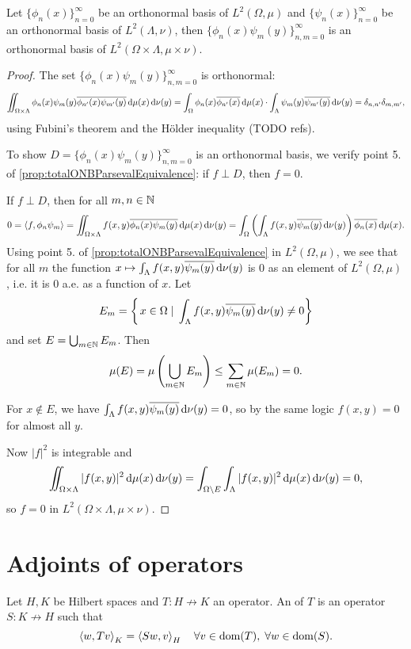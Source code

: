 \begin{lemma}
Let $\{\phi_n(x)\}^\infty_{n=0}$ be an orthonormal basis of $L^2(\Omega, \mu)$ and $\{\psi_n(x)\}^\infty_{n=0}$ be an orthonormal basis of $L^2(\Lambda, \nu)$, then $\{\phi_n(x)\psi_m(y)\}^\infty_{n,m=0}$ is an orthonormal basis of $L^2(\Omega\times\Lambda, \mu\times\nu)$.
\end{lemma}
\begin{proof}
The set $\{\phi_n(x)\psi_m(y)\}^\infty_{n,m=0}$ is orthonormal:
\[ \iint_{\Omega\times\Lambda} \phi_n(x)\psi_m(y)\overline{\phi_{n'}(x)\psi_{m'}(y)}\operatorname{d \!}{\mu(x)}\operatorname{d \!}{\nu(y)} = \int_\Omega\phi_n(x)\overline{\phi_{n'}(x)}\operatorname{d \!}{\mu(x)} \cdot \int_\Lambda\psi_m(y)\overline{\psi_{m'}(y)}\operatorname{d \!}{\nu(y)} = \delta_{n,n'}\delta_{m,m'}, \]
using Fubini's theorem and the Hölder inequality (TODO refs).

To show $D = \{\phi_n(x)\psi_m(y)\}^\infty_{n,m=0}$ is an orthonormal basis, we verify point 5. of \ref{prop:totalONBParsevalEquivalence}: if $f\perp D$, then $f = 0$.

If $f\perp D$, then for all $m,n\in \mathbb{N}$
\[ 0 = \left\langle f, \phi_n\psi_m \right\rangle = \iint_{\Omega\times\Lambda}f(x,y)\overline{\phi_n(x)\psi_m(y)}\operatorname{d \!}{\mu(x)}\operatorname{d \!}{\nu(y)} = \int_\Omega \left(\int_\Lambda f(x,y)\overline{\psi_m(y)}\operatorname{d \!}{\nu(y)} \right)\overline{\phi_n(x)}\operatorname{d \!}{\mu(x)}.  \]
Using point 5. of \ref{prop:totalONBParsevalEquivalence} in $L^2(\Omega,\mu)$, we see that for all $m$ the function $x\mapsto\int_\Lambda f(x,y)\overline{\psi_m(y)}\operatorname{d \!}{\nu(y)}$ is $0$ as an element of $L^2(\Omega, \mu)$, i.e. it is $0$ a.e. as a function of $x$. Let
\[ E_m = \left\{\left. x\in\Omega \;\right|\;  \int_\Lambda f(x,y)\overline{\psi_m(y)}\operatorname{d \!}{\nu(y)} \neq 0 \right\} \]
and set $E = \bigcup_{m\in\mathbb{N}}E_m$.
Then
\[ \mu(E) =  \mu\left(\bigcup_{m\in \mathbb{N}}E_m\right) \leq \sum_{m\in\mathbb{N}}\mu(E_m) = 0. \]

For $x\notin E$, we have $\int_\Lambda f(x,y)\overline{\psi_m(y)}\operatorname{d \!}{\nu(y)} = 0$, so by the same logic $f(x,y) = 0$ for almost all $y$. 

Now $|f|^2$ is integrable and
\[ \iint_{\Omega\times \Lambda}|f(x,y)|^2\operatorname{d \!}{\mu(x)}\operatorname{d \!}{\nu(y)} = \int_{\Omega\setminus E}\int_\Lambda |f(x,y)|^2\operatorname{d \!}{\mu(x)}\operatorname{d \!}{\nu(y)} = 0, \]
so $f=0$ in $L^2(\Omega\times\Lambda, \mu\times\nu)$.
\end{proof}


\section{Adjoints of operators}
\begin{definition}
Let $H,K$ be Hilbert spaces and $T: H\not\to K$ an operator. An  of $T$ is an operator $S: K\not\to H$ such that
\[ \left\langle w,Tv \right\rangle_K = \left\langle S w,v \right\rangle_H \quad \forall v\in \operatorname{dom}(T),\; \forall w\in \operatorname{dom}(S). \]
\end{definition}

